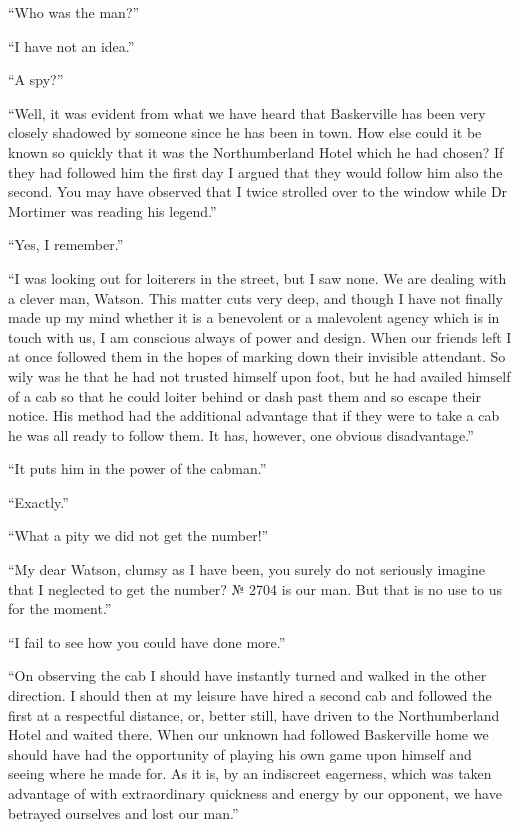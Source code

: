 \documentclass[paper=a5,BCOR=7mm,twoside,DIV=calc,12pt,usegeometry,openany,chapterprefix,endperiod,headings=big]{scrbook} %
\begin{document}
\enquote{Who was the man?}

\enquote{I have not an idea.}

\enquote{A spy?}

\enquote{Well, it was evident from what we have heard that Baskerville has been very closely shadowed by someone since he has been in town. How else could it be known so quickly that it was the Northumberland Hotel which he had chosen? If they had followed him the first day I argued that they would follow him also the second. You may have observed that I twice strolled over to the window while Dr Mortimer was reading his legend.}

\enquote{Yes, I remember.}

\enquote{I was looking out for loiterers in the street, but I saw none. We are dealing with a clever man, Watson. This matter cuts very deep, and though I have not finally made up my mind whether it is a benevolent or a malevolent agency which is in touch with us, I am conscious always of power and design. When our friends left I at once followed them in the hopes of marking down their invisible attendant. So wily was he that he had not trusted himself upon foot, but he had availed himself of a cab so that he could loiter behind or dash past them and so escape their notice. His method had the additional advantage that if they were to take a cab he was all ready to follow them. It has, however, one obvious disadvantage.}

\enquote{It puts him in the power of the cabman.}

\enquote{Exactly.}

\enquote{What a pity we did not get the number!}

\enquote{My dear Watson, clumsy as I have been, you surely do not seriously imagine that I neglected to get the number? № 2704 is our man. But that is no use to us for the moment.}

\enquote{I fail to see how you could have done more.}

\enquote{On observing the cab I should have instantly turned and walked in the other direction. I should then at my leisure have hired a second cab and followed the first at a respectful distance, or, better still, have driven to the Northumberland Hotel and waited there. When our unknown had followed Baskerville home we should have had the opportunity of playing his own game upon himself and seeing where he made for. As it is, by an indiscreet eagerness, which was taken advantage of with extraordinary quickness and energy by our opponent, we have betrayed ourselves and lost our man.}
\end{document}
